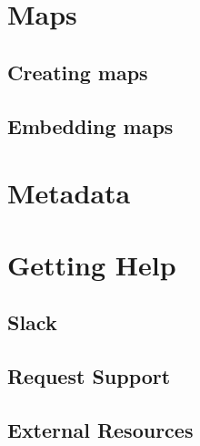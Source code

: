 \documentclass[
]{book}
\begin{document}
\hypertarget{maps}{%
\chapter{Maps}\label{maps}}

\hypertarget{creating-maps}{%
\section{Creating maps}\label{creating-maps}}

\hypertarget{embedding-maps}{%
\section{Embedding maps}\label{embedding-maps}}

\hypertarget{metadata}{%
\chapter{Metadata}\label{metadata}}

\hypertarget{getting-help}{%
\chapter{Getting Help}\label{getting-help}}

\hypertarget{slack}{%
\section{Slack}\label{slack}}

\hypertarget{request-support}{%
\section{Request Support}\label{request-support}}

\hypertarget{external-resources}{%
\section{External Resources}\label{external-resources}}

  
\end{document}
